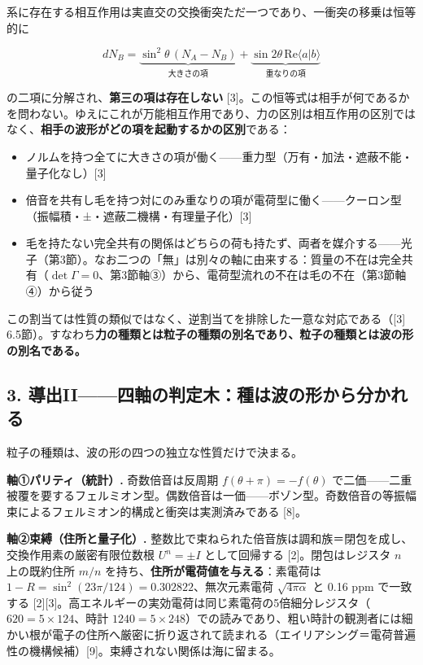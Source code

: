 \documentclass[
  a4paper,
]{ltjsarticle}
\providecommand{\tightlist}{%
  \setlength{\itemsep}{0pt}\setlength{\parskip}{0pt}}
\begin{document}
系に存在する相互作用は実直交の交換衝突ただ一つであり、一衝突の移乗は恒等的に

\[
dN_B=\underbrace{\sin^2\theta\,(N_A-N_B)}_{\text{大きさの項}}+\underbrace{\sin 2\theta\,\mathrm{Re}\langle a|b\rangle}_{\text{重なりの項}}
\]

の二項に分解され、\textbf{第三の項は存在しない}
{[}3{]}。この恒等式は相手が何であるかを問わない。ゆえにこれが万能相互作用であり、力の区別は相互作用の区別ではなく、\textbf{相手の波形がどの項を起動するかの区別}である：

\begin{itemize}
\tightlist
\item
  ノルムを持つ全てに大きさの項が働く------重力型（万有・加法・遮蔽不能・量子化なし）{[}3{]}
\item
  倍音を共有し毛を持つ対にのみ重なりの項が電荷型に働く------クーロン型（振幅積・±・遮蔽二機構・有理量子化）{[}3{]}
\item
  毛を持たない完全共有の関係はどちらの荷も持たず、両者を媒介する------光子（第3節）。なお二つの「無」は別々の軸に由来する：質量の不在は完全共有（\(\det\Gamma=0\)、第3節軸③）から、電荷型流れの不在は毛の不在（第3節軸④）から従う
\end{itemize}

この割当ては性質の類似ではなく、逆割当てを排除した一意な対応である（{[}3{]}
6.5節）。すなわち\textbf{力の種類とは粒子の種類の別名であり、粒子の種類とは波の形の別名である。}

\subsection{3.
導出II------四軸の判定木：種は波の形から分かれる}\label{ux5c0eux51faiiux56dbux8ef8ux306eux5224ux5b9aux6728ux7a2eux306fux6ce2ux306eux5f62ux304bux3089ux5206ux304bux308cux308b}

粒子の種類は、波の形の四つの独立な性質だけで決まる。

\textbf{軸①パリティ（統計）.} 奇数倍音は反周期
\(f(\theta+\pi)=-f(\theta)\)
で二価------二重被覆を要するフェルミオン型。偶数倍音は一価------ボゾン型。奇数倍音の等振幅束によるフェルミオン的構成と衝突は実測済みである
{[}8{]}。

\textbf{軸②束縛（住所と量子化）.}
整数比で束ねられた倍音族は調和族＝閉包を成し、交換作用素の厳密有限位数根
\(U^n=\pm I\) として回帰する {[}2{]}。閉包はレジスタ \(n\) 上の既約住所
\(m/n\) を持ち、\textbf{住所が電荷値を与える}：素電荷は
\(1-R=\sin^2(23\pi/124)=0.302822\)、無次元素電荷 \(\sqrt{4\pi\alpha}\)
と 0.16 ppm で一致する
{[}2{]}{[}3{]}。高エネルギーの実効電荷は同じ素電荷の5倍細分レジスタ（\(620=5\times124\)、時計
\(1240=5\times248\)）での読みであり、粗い時計の観測者には細かい根が電子の住所へ厳密に折り返されて読まれる（エイリアシング＝電荷普遍性の機構候補）{[}9{]}。束縛されない関係は海に留まる。
\end{document}
